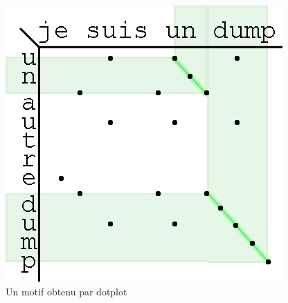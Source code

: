 \begin{figure}[!h]
  \begin{center}
  \includegraphics[scale=1]{res/04-2-dotplot.png}
  \caption{Un motif obtenu par dotplot}
  \label{04-1-dotplot}
  \end{center}
\end{figure}